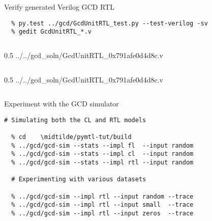 \begin{task}\begin{frame}[fragile]{Verify generated Verilog GCD RTL}
\vspace{-0.2in}
\begin{Verbatim}[commandchars=\\\{\}]
  % cd    \midtilde/pymtl-tut/build
  % py.test ../gcd/GcdUnitRTL_test.py --test-verilog -sv
  % gedit GcdUnitRTL_*.v
\end{Verbatim}

\vspace{-0.1in}
\begin{cbxcols}
\begin{column}{0.5\tw}
%
{../../gcd_soln/GcdUnitRTL_0x791afe0d4d8c.v}
\end{column}
\begin{column}{0.5\tw}
%
{../../gcd_soln/GcdUnitRTL_0x791afe0d4d8c.v}
\end{column}
\end{cbxcols}

\end{frame}
\end{task}

\begin{task}\begin{frame}[fragile]{Experiment with the GCD simulator}
\vspace{-0.25in}
\begin{Verbatim}[commandchars=\\\{\}]
  # Simulating both the CL and RTL models

  % cd    \midtilde/pymtl-tut/build
  % ../gcd/gcd-sim --stats --impl fl  --input random
  % ../gcd/gcd-sim --stats --impl cl  --input random
  % ../gcd/gcd-sim --stats --impl rtl --input random

  # Experimenting with various datasets

  % ../gcd/gcd-sim --impl rtl --input random --trace
  % ../gcd/gcd-sim --impl rtl --input small  --trace
  % ../gcd/gcd-sim --impl rtl --input zeros  --trace

\end{Verbatim}
\end{frame}
\end{task}

